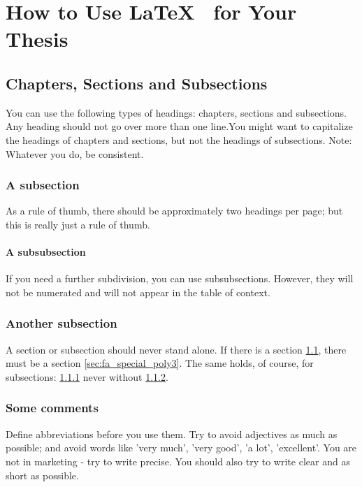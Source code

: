 \chapter{How to Use \LaTeX~ for Your Thesis}
\label{chap:fundamentals}


\section{Chapters, Sections and Subsections}
\label{sec:fa_special_poly}

You can use the following types of headings: chapters, sections and subsections. Any heading should not go over more than one line.You might want to capitalize the headings of chapters and sections, but not the headings of subsections. Note: Whatever you do, be consistent.

\subsection{A subsection}\label{ssec:fa_legendre_poly}
As a rule of thumb, there should be approximately two headings per page; 
but this is really just a rule of thumb.

\subsubsection{A subsubsection}
If you need a further subdivision, you can use subsubsections. However, they will not be numerated and will not appear in the table of context.

\subsection{Another subsection}\label{sec:fa_special_poly2}
A section or subsection should never stand alone. If there is a section \ref{sec:fa_special_poly}, there must be a section \ref{sec:fa_special_poly3}. The same holds, of course, for subsections: \ref{ssec:fa_legendre_poly} never without \ref{sec:fa_special_poly2}.

\subsection{Some comments}
Define abbreviations before you use them. Try to avoid adjectives as much as possible; and avoid words like 'very much', 'very good', 'a lot', 'excellent'. You are not in marketing - try to write precise. You should also try to write clear and as short as possible.



